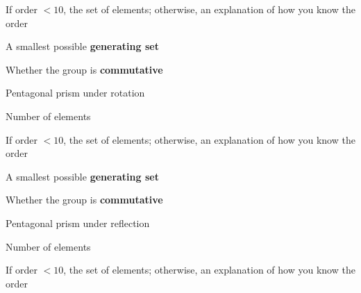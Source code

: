 \documentclass[../gatm_answers.tex]{subfiles}
\begin{document}
\begin{inner_problem}
\item If order $< 10$, the set of elements; otherwise, an explanation of how you know the order
\end{inner_problem}

\begin{inner_problem}
\item A smallest possible \textbf{generating set}
\end{inner_problem}

\begin{inner_problem}
\item Whether the group is \textbf{commutative}
\end{inner_problem}

\begin{outer_problem}
\item Pentagonal prism under rotation
\end{outer_problem}

\begin{inner_problem}[start=1]
\item Number of elements
\end{inner_problem}

\begin{inner_problem}
\item If order $< 10$, the set of elements; otherwise, an explanation of how you know the order
\end{inner_problem}

\begin{inner_problem}
\item A smallest possible \textbf{generating set}
\end{inner_problem}

\begin{inner_problem}
\item Whether the group is \textbf{commutative}
\end{inner_problem}

\begin{outer_problem}
\item Pentagonal prism under reflection
\end{outer_problem}

\begin{inner_problem}[start=1]
\item Number of elements
\end{inner_problem}

\begin{inner_problem}
\item If order $< 10$, the set of elements; otherwise, an explanation of how you know the order
\end{inner_problem}
\end{document}

